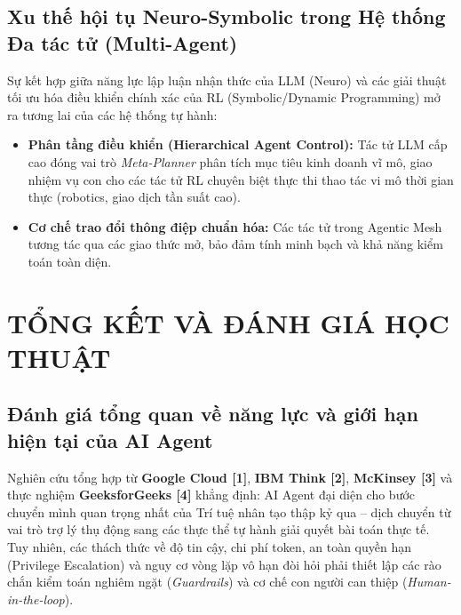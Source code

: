 \documentclass[12pt,a4paper]{article}
\begin{document}
\subsection{Xu thế hội tụ Neuro-Symbolic trong Hệ thống Đa tác tử (Multi-Agent)}
Sự kết hợp giữa năng lực lập luận nhận thức của LLM (Neuro) và các giải thuật tối ưu hóa điều khiển chính xác của RL (Symbolic/Dynamic Programming) mở ra tương lai của các hệ thống tự hành:
\begin{itemize}
    \item \textbf{Phân tầng điều khiển (Hierarchical Agent Control):} Tác tử LLM cấp cao đóng vai trò \textit{Meta-Planner} phân tích mục tiêu kinh doanh vĩ mô, giao nhiệm vụ con cho các tác tử RL chuyên biệt thực thi thao tác vi mô thời gian thực (robotics, giao dịch tần suất cao).
    \item \textbf{Cơ chế trao đổi thông điệp chuẩn hóa:} Các tác tử trong Agentic Mesh tương tác qua các giao thức mở, bảo đảm tính minh bạch và khả năng kiểm toán toàn diện.
\end{itemize}

\clearpage


\section{TỔNG KẾT VÀ ĐÁNH GIÁ HỌC THUẬT}

\subsection{Đánh giá tổng quan về năng lực và giới hạn hiện tại của AI Agent}
Nghiên cứu tổng hợp từ \textbf{Google Cloud [1]}, \textbf{IBM Think [2]}, \textbf{McKinsey [3]} và thực nghiệm \textbf{GeeksforGeeks [4]} khẳng định: AI Agent đại diện cho bước chuyển mình quan trọng nhất của Trí tuệ nhân tạo thập kỷ qua -- dịch chuyển từ vai trò trợ lý thụ động sang các thực thể tự hành giải quyết bài toán thực tế. Tuy nhiên, các thách thức về độ tin cậy, chi phí token, an toàn quyền hạn (Privilege Escalation) và nguy cơ vòng lặp vô hạn đòi hỏi phải thiết lập các rào chắn kiểm toán nghiêm ngặt (\textit{Guardrails}) và cơ chế con người can thiệp (\textit{Human-in-the-loop}).
\end{document}
